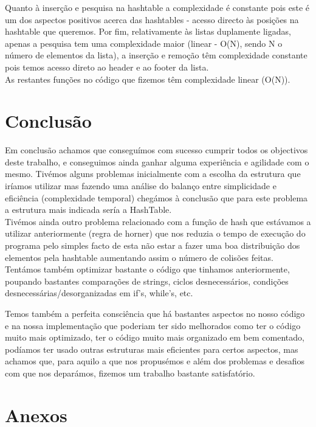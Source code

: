 Quanto à inserção e pesquisa na hashtable a complexidade é constante pois este é um dos aspectos positivos acerca das hashtables - acesso directo às posições na hashtable que queremos. Por fim, relativamente às listas duplamente ligadas, apenas a pesquisa tem uma complexidade maior (linear - O(N), sendo N o número de elementos da lista), a inserção e remoção têm complexidade constante pois temos acesso direto ao header e ao footer da lista.\\ 

As restantes funções no código que fizemos têm complexidade linear (O(N)).

\newpage
\section{Conclusão}

Em conclusão achamos que conseguímos com sucesso cumprir todos os objectivos deste trabalho, e conseguimos ainda ganhar alguma experiência e agilidade com o mesmo. Tivémos alguns problemas inicialmente com a escolha da estrutura que iríamos utilizar mas fazendo uma análise do balanço entre simplicidade e eficiência (complexidade temporal) chegámos à conclusão que para este problema a estrutura mais indicada sería a HashTable.\\

Tivémos ainda outro problema relacionado com a função de hash que estávamos a utilizar anteriormente (regra de horner) que nos reduzia o tempo de execução do programa pelo simples facto de esta não estar a fazer uma boa distribuição dos elementos pela hashtable aumentando assim o número de colisões feitas. Tentámos também optimizar bastante o código que tinhamos anteriormente, poupando bastantes comparações de strings, ciclos desnecessários, condições desnecessárias/desorganizadas em if's, while's, etc.

Temos também a perfeita consciência que há bastantes aspectos no nosso código e na nossa implementação que poderiam ter sido melhorados como ter o código muito mais optimizado, ter o código muito mais organizado em bem comentado, podíamos ter usado outras estruturas mais eficientes para certos aspectos, mas achamos que, para aquilo a que nos propusémos e além dos problemas e desafios com que nos deparámos, fizemos um trabalho bastante satisfatório.

\newpage
\section{Anexos}

